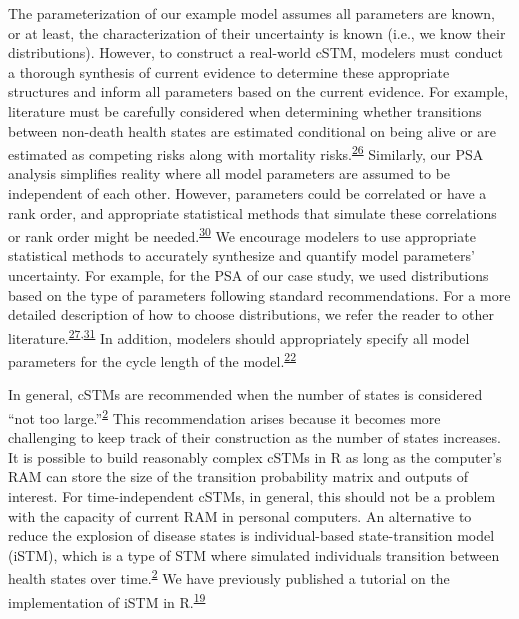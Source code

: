\documentclass[
]{article}
\begin{document}
The parameterization of our example model assumes all parameters are known, or at least, the characterization of their uncertainty is known (i.e., we know their distributions). However, to construct a real-world cSTM, modelers must conduct a thorough synthesis of current evidence to determine these appropriate structures and inform all parameters based on the current evidence. For example, literature must be carefully considered when determining whether transitions between non-death health states are estimated conditional on being alive or are estimated as competing risks along with mortality risks.\textsuperscript{\protect\hyperlink{ref-Briggs2012}{26}} Similarly, our PSA analysis simplifies reality where all model parameters are assumed to be independent of each other. However, parameters could be correlated or have a rank order, and appropriate statistical methods that simulate these correlations or rank order might be needed.\textsuperscript{\protect\hyperlink{ref-Goldhaber-Fiebert2015}{30}} We encourage modelers to use appropriate statistical methods to accurately synthesize and quantify model parameters' uncertainty. For example, for the PSA of our case study, we used distributions based on the type of parameters following standard recommendations. For a more detailed description of how to choose distributions, we refer the reader to other literature.\textsuperscript{\protect\hyperlink{ref-Briggs2002}{27},\protect\hyperlink{ref-Briggs2003}{31}} In addition, modelers should appropriately specify all model parameters for the cycle length of the model.\textsuperscript{\protect\hyperlink{ref-Hunink2014}{22}}

In general, cSTMs are recommended when the number of states is considered ``not too large.''\textsuperscript{\protect\hyperlink{ref-Siebert2012c}{2}} This recommendation arises because it becomes more challenging to keep track of their construction as the number of states increases. It is possible to build reasonably complex cSTMs in R as long as the computer's RAM can store the size of the transition probability matrix and outputs of interest. For time-independent cSTMs, in general, this should not be a problem with the capacity of current RAM in personal computers. An alternative to reduce the explosion of disease states is individual-based state-transition model (iSTM), which is a type of STM where simulated individuals transition between health states over time.\textsuperscript{\protect\hyperlink{ref-Siebert2012c}{2}} We have previously published a tutorial on the implementation of iSTM in R.\textsuperscript{\protect\hyperlink{ref-Krijkamp2018}{19}}
\end{document}

